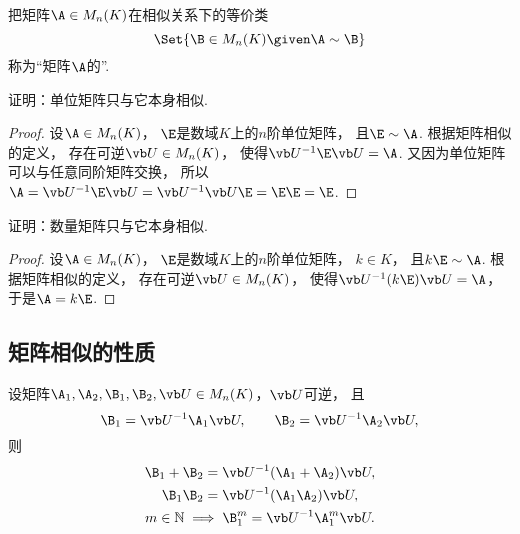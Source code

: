 \begin{definition}
把矩阵\(\A \in M_n(K)\)在相似关系下的等价类\[
	\Set{ \B \in M_n(K) \given \A\sim\B }
\]称为“矩阵\(\A\)的”.
\end{definition}

\begin{example}
证明：单位矩阵只与它本身相似.
\begin{proof}
设\(\A \in M_n(K)\)，
\(\E\)是数域\(K\)上的\(n\)阶单位矩阵，
且\(\E \sim \A\).
根据矩阵相似的定义，
存在可逆\(\P \in M_n(K)\)，
使得\(\P^{-1} \E \P = \A\).
又因为单位矩阵可以与任意同阶矩阵交换，
所以\(\A
= \P^{-1} \E \P
= \P^{-1} \P \E
= \E \E
= \E\).
\end{proof}
\end{example}
\begin{example}
证明：数量矩阵只与它本身相似.
\begin{proof}
设\(\A \in M_n(K)\)，
\(\E\)是数域\(K\)上的\(n\)阶单位矩阵，
\(k \in K\)，
且\(k\E \sim \A\).
根据矩阵相似的定义，
存在可逆\(\P \in M_n(K)\)，
使得\(\P^{-1} (k\E) \P = \A\)，
于是\(\A = k\E\).
\end{proof}
\end{example}

\subsection{矩阵相似的性质}
\begin{proposition}
设矩阵\(\A_1,\A_2,\B_1,\B_2,\P \in M_n(K)\)，\(\P\)可逆，
且\[
	\B_1=\P^{-1}\A_1\P, \qquad
	\B_2=\P^{-1}\A_2\P,
\]
则\begin{gather}
	\B_1 + \B_2 = \P^{-1} (\A_1 + \A_2) \P, \\
	\B_1 \B_2 = \P^{-1} (\A_1 \A_2) \P, \\
	m\in\mathbb{N} \implies \B_1^m = \P^{-1}\A_1^m\P.
		\label{equation:相似矩阵.利用相似性简化计算}
\end{gather}
\end{proposition}

